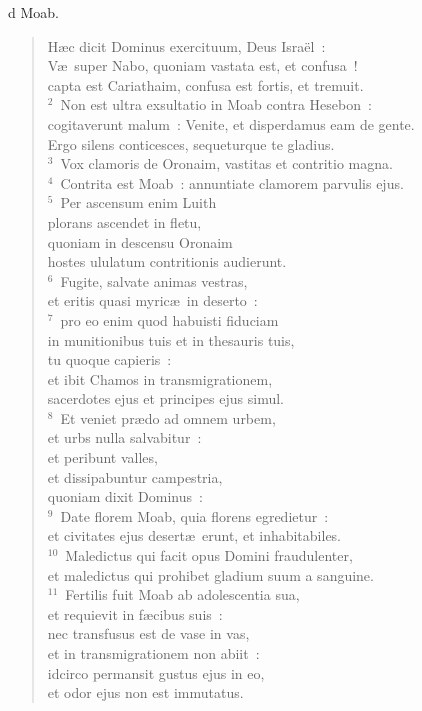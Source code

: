 \bchapter
{}d Moab. \begin{verse}H\ae c dicit Dominus exercituum, Deus Isra\"el~:\\ V\ae\ super Nabo, quoniam vastata est, et confusa~!\\ capta est Cariathaim, confusa est fortis, et tremuit.\\
${}^{2}$~Non est ultra exsultatio in Moab contra Hesebon~:\\ cogitaverunt malum~: Venite, et disperdamus eam de gente.\\ Ergo silens conticesces, sequeturque te gladius.\\
${}^{3}$~Vox clamoris de Oronaim, vastitas et contritio magna.\\
${}^{4}$~Contrita est Moab~: annuntiate clamorem parvulis ejus.\\
${}^{5}$~Per ascensum enim Luith\\ plorans ascendet in fletu,\\ quoniam in descensu Oronaim\\ hostes ululatum contritionis audierunt.\\
${}^{6}$~Fugite, salvate animas vestras,\\ et eritis quasi myric\ae\ in deserto~:\\
${}^{7}$~pro eo enim quod habuisti fiduciam\\ in munitionibus tuis et in thesauris tuis,\\ tu quoque capieris~:\\ et ibit Chamos in transmigrationem,\\ sacerdotes ejus et principes ejus simul.\\
${}^{8}$~Et veniet pr\ae do ad omnem urbem,\\ et urbs nulla salvabitur~:\\ et peribunt valles,\\ et dissipabuntur campestria,\\ quoniam dixit Dominus~:\\
${}^{9}$~Date florem Moab, quia florens egredietur~:\\ et civitates ejus desert\ae\ erunt, et inhabitabiles.\\
${}^{10}$~Maledictus qui facit opus Domini fraudulenter,\\ et maledictus qui prohibet gladium suum a sanguine.\\
${}^{11}$~Fertilis fuit Moab ab adolescentia sua,\\ et requievit in f\ae cibus suis~:\\ nec transfusus est de vase in vas,\\ et in transmigrationem non abiit~:\\ idcirco permansit gustus ejus in eo,\\ et odor ejus non est immutatus.\\

\end{verse}
